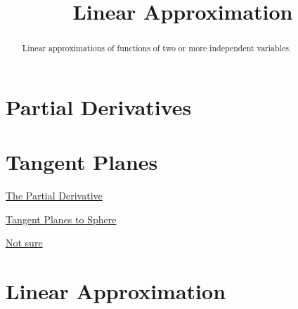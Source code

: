 \documentclass{ximera}
\title{Linear Approximation}
\begin{document}
\begin{abstract}
Linear approximations of functions of two or more independent variables.
\end{abstract}
\maketitle


\section{Partial Derivatives}




\section{Tangent Planes}
\begin{exploration}  \label{Edf754665}

 
\begin{onlineOnly}
    \begin{center}
\end{center}
\end{onlineOnly}


\href{https://www.desmos.com/calculator/y0h5kuvmbt}{The Partial Derivative}

\end{exploration}



\begin{exploration}  \label{Edf5khj4665}

\href{https://www.desmos.com/3d/d78d5a3138}{Tangent Planes to Sphere}

\end{exploration}

\begin{exploration}  \label{Ede5fhj4665}
\href{https://www.geogebra.org/m/Hud6Hnpk}{Not sure}
\end{exploration}


\section{Linear Approximation}
\end{document}
